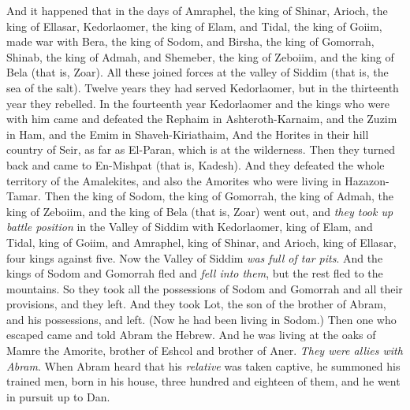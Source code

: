 \begin{biblechapter} %
 And it happened that in the days of Amraphel, the king of Shinar, Arioch, the king of Ellasar, Kedorlaomer, the king of Elam, and Tidal, the king of Goiim,
\verse made war with Bera, the king of Sodom, and Birsha, the king of Gomorrah, Shinab, the king of Admah, and Shemeber, the king of Zeboiim, and the king of Bela (that is, Zoar).
\verse All these joined forces at the valley of Siddim (that is, the sea of the salt).
\verse Twelve years they had served Kedorlaomer, but in the thirteenth year they rebelled.
\verse In the fourteenth year Kedorlaomer and the kings who were with him came and defeated the Rephaim in Ashteroth-Karnaim, and the Zuzim in Ham, and the Emim in Shaveh-Kiriathaim,
\verse And the Horites in their hill country of Seir, as far as El-Paran, which is at the wilderness.
\verse Then they turned back and came to En-Mishpat (that is, Kadesh). And they defeated the whole territory of the Amalekites, and also the Amorites who were living in Hazazon-Tamar.
\verse Then the king of Sodom, the king of Gomorrah, the king of Admah, the king of Zeboiim, and the king of Bela (that is, Zoar) went out, and \textit{they took up battle position} in the Valley of Siddim
\verse with Kedorlaomer, king of Elam, and Tidal, king of Goiim, and Amraphel, king of Shinar, and Arioch, king of Ellasar, four kings against five.
\verse Now the Valley of Siddim \textit{was full of tar pits}. And the kings of Sodom and Gomorrah fled and \textit{fell into them}, but the rest fled to the mountains.
\verse So they took all the possessions of Sodom and Gomorrah and all their provisions, and they left.
\verse And they took Lot, the son of the brother of Abram, and his possessions, and left. (Now he had been living in Sodom.)
\verse Then one who escaped came and told Abram the Hebrew. And he was living at the oaks of Mamre the Amorite, brother of Eshcol and brother of Aner. \textit{They were allies with Abram}.
\verse When Abram heard that his \textit{relative} was taken captive, he summoned his trained men, born in his house, three hundred and eighteen of them, and he went in pursuit up to Dan.

\end{biblechapter}
